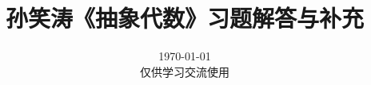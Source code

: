 \documentclass[hyper]{solutions-cn}
\title{孙笑涛《抽象代数》习题解答与补充}
\date{
    \today
    \\[2em]
    仅供学习交流使用
}
\begin{document}
\maketitle
\tableofcontents


\clearpage

\clearpage

\clearpage

\clearpage

\clearpage

\nocite{*}


\end{document}
